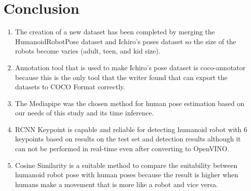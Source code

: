 \section{Conclusion}
\label{sec:conclusion}


\begin{enumerate}

    \item The creation of a new dataset has been completed by merging the HumanoidRobotPose dataset and Ichiro's poses dataset 
          so the size of the robots become varies (adult, teen, and kid size).
    \item Annotation tool that is used to make Ichiro's pose dataset is coco-annotator because this is the only tool that the writer found that can export the datasets to COCO Format correctly.
    \item The Mediapipe was the chosen method for human pose estimation based on our needs of this study and its time inference.
    \item RCNN Keypoint is capable and reliable for detecting humanoid robot with 6 keypoints  based on results on the test set and detection results
          although it can not be performed in real-time even after converting to OpenVINO.
    \item Cosine Similarity is a suitable method to compare the suitability between humanoid robot pose with human poses because the result is higher when
          humans make a movement that is more like a robot and vice versa.
  
\end{enumerate}